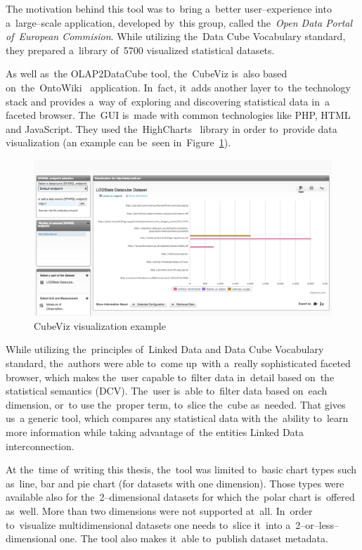 The motivation behind this tool was to~bring a~better user--experience into a~large--scale application, developed by~this group, called the~\emph{Open Data Portal of~European Commision}. While utilizing the~Data Cube Vocabulary standard, they 
prepared a~library of~5700 visualized statistical datasets.

\begin{sloppypar}
As well as~the OLAP2DataCube tool, the~CubeViz is~also based on~the~\mbox{OntoWiki}~\cite{ontowiki}
application. In~fact, it~adds another layer to~the 
technology stack and provides a~way of~exploring and discovering statistical 
data in~a faceted browser. The~GUI is~made with common technologies like PHP,
HTML and JavaScript. They used the~HighCharts~\cite{highcharts} library in
order to~provide data visualization (an example can be~seen in~Figure~\ref{fig:cubeviz}).
\end{sloppypar}

\begin{figure}
	\centering
	\includegraphics[width=140mm]{img/cubeviz.png}
	\caption{CubeViz visualization example}
	\label{fig:cubeviz}
\end{figure}

While utilizing the~principles of~Linked Data and Data Cube Vocabulary 
standard, the~authors were able to~come up~with a~really sophisticated faceted 
browser, which makes the~user capable to~filter data in~detail based on~the statistical 
semantics (DCV). The~user is~able to~filter data based on~each dimension, or~to use the~proper term, to~slice the~cube as~needed. That gives us~a generic tool, which 
compares any statistical data with the~ability to~learn more 
information while taking advantage of~the entities Linked Data interconnection.

At the~time of~writing this thesis, the~tool was limited to~basic chart types
such as~line, bar and pie chart (for datasets with one dimension). Those types 
were available also for the~2--dimensional datasets for which the~polar 
chart is~offered as~well. More than two dimensions were not supported at~all. In~order to~visualize 
multidimensional datasets one needs to~slice it~into a~2--or--less--dimensional one.
The tool also makes it~able to~publish dataset metadata.

